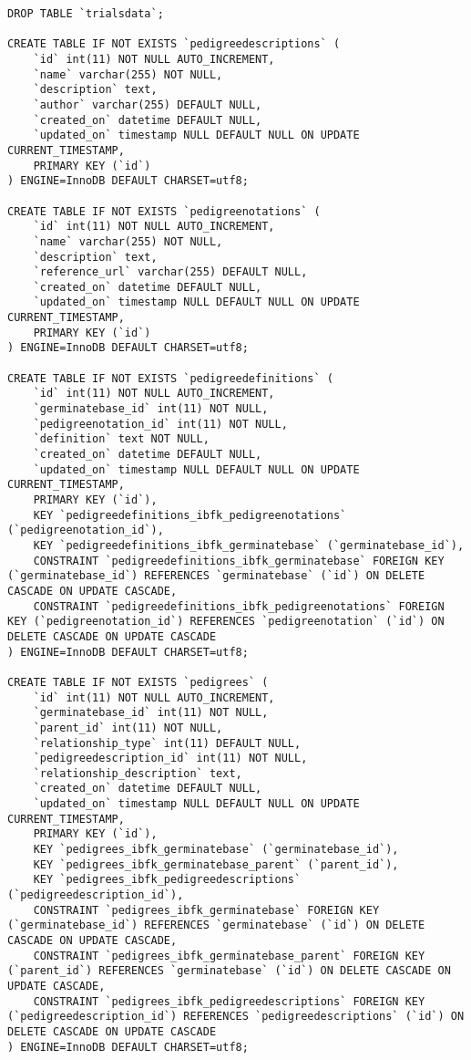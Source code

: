\begin{itemize}
\begin{lstlisting}[style=SQL]
DROP TABLE `trialsdata`;

CREATE TABLE IF NOT EXISTS `pedigreedescriptions` (
	`id` int(11) NOT NULL AUTO_INCREMENT,
	`name` varchar(255) NOT NULL,
	`description` text,
	`author` varchar(255) DEFAULT NULL,
	`created_on` datetime DEFAULT NULL,
	`updated_on` timestamp NULL DEFAULT NULL ON UPDATE CURRENT_TIMESTAMP,
	PRIMARY KEY (`id`)
) ENGINE=InnoDB DEFAULT CHARSET=utf8;

CREATE TABLE IF NOT EXISTS `pedigreenotations` (
	`id` int(11) NOT NULL AUTO_INCREMENT,
	`name` varchar(255) NOT NULL,
	`description` text,
	`reference_url` varchar(255) DEFAULT NULL,
	`created_on` datetime DEFAULT NULL,
	`updated_on` timestamp NULL DEFAULT NULL ON UPDATE CURRENT_TIMESTAMP,
	PRIMARY KEY (`id`)
) ENGINE=InnoDB DEFAULT CHARSET=utf8;

CREATE TABLE IF NOT EXISTS `pedigreedefinitions` (
	`id` int(11) NOT NULL AUTO_INCREMENT,
	`germinatebase_id` int(11) NOT NULL,
	`pedigreenotation_id` int(11) NOT NULL,
	`definition` text NOT NULL,
	`created_on` datetime DEFAULT NULL,
	`updated_on` timestamp NULL DEFAULT NULL ON UPDATE CURRENT_TIMESTAMP,
	PRIMARY KEY (`id`),
	KEY `pedigreedefinitions_ibfk_pedigreenotations` (`pedigreenotation_id`),
	KEY `pedigreedefinitions_ibfk_germinatebase` (`germinatebase_id`),
	CONSTRAINT `pedigreedefinitions_ibfk_germinatebase` FOREIGN KEY (`germinatebase_id`) REFERENCES `germinatebase` (`id`) ON DELETE CASCADE ON UPDATE CASCADE,
	CONSTRAINT `pedigreedefinitions_ibfk_pedigreenotations` FOREIGN KEY (`pedigreenotation_id`) REFERENCES `pedigreenotation` (`id`) ON DELETE CASCADE ON UPDATE CASCADE
) ENGINE=InnoDB DEFAULT CHARSET=utf8;

CREATE TABLE IF NOT EXISTS `pedigrees` (
	`id` int(11) NOT NULL AUTO_INCREMENT,
	`germinatebase_id` int(11) NOT NULL,
	`parent_id` int(11) NOT NULL,
	`relationship_type` int(11) DEFAULT NULL,
	`pedigreedescription_id` int(11) NOT NULL,
	`relationship_description` text,
	`created_on` datetime DEFAULT NULL,
	`updated_on` timestamp NULL DEFAULT NULL ON UPDATE CURRENT_TIMESTAMP,
	PRIMARY KEY (`id`),
	KEY `pedigrees_ibfk_germinatebase` (`germinatebase_id`),
	KEY `pedigrees_ibfk_germinatebase_parent` (`parent_id`),
	KEY `pedigrees_ibfk_pedigreedescriptions` (`pedigreedescription_id`),
	CONSTRAINT `pedigrees_ibfk_germinatebase` FOREIGN KEY (`germinatebase_id`) REFERENCES `germinatebase` (`id`) ON DELETE CASCADE ON UPDATE CASCADE,
	CONSTRAINT `pedigrees_ibfk_germinatebase_parent` FOREIGN KEY (`parent_id`) REFERENCES `germinatebase` (`id`) ON DELETE CASCADE ON UPDATE CASCADE,
	CONSTRAINT `pedigrees_ibfk_pedigreedescriptions` FOREIGN KEY (`pedigreedescription_id`) REFERENCES `pedigreedescriptions` (`id`) ON DELETE CASCADE ON UPDATE CASCADE
) ENGINE=InnoDB DEFAULT CHARSET=utf8;


\end{lstlisting}
\end{itemize}
